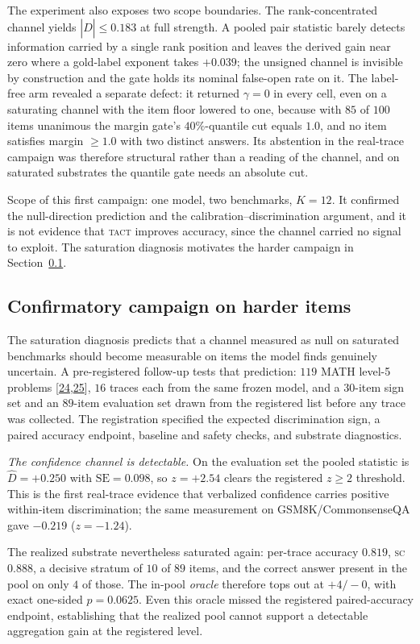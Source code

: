 \documentclass[conference]{IEEEtran}
\newcommand{\Dhat}{\widehat{D}}
\newcommand{\SC}{\textsc{sc}}
\newcommand{\TACT}{\textsc{tact}}
\begin{document}
The experiment also exposes two scope boundaries. The
rank-concentrated channel yields $|\Dhat|\le0.183$ at full strength. A pooled
pair statistic barely detects information carried by a single rank position and
leaves the derived gain near zero where a gold-label exponent takes $+0.039$;
the unsigned channel is invisible by construction and the gate holds its
nominal false-open rate on it. The label-free arm revealed a separate defect: it
returned $\gamma=0$ in every cell, even on a saturating channel with the item floor
lowered to one, because with $85$ of $100$ items unanimous the margin gate's
$40\%$-quantile cut equals $1.0$, and no item satisfies margin $\ge 1.0$ with
two distinct answers. Its abstention in the real-trace campaign was therefore structural rather
than a reading of the channel, and on saturated substrates the quantile gate
needs an absolute cut.

Scope of this first campaign: one model, two benchmarks, $K{=}12$. It confirmed
the null-direction prediction and the calibration--discrimination argument, and
it is not evidence that \TACT{} improves accuracy, since the channel carried no
signal to exploit. The saturation diagnosis motivates the harder campaign in
Section~\ref{sec:hard}.

\subsection{Confirmatory campaign on harder items}\label{sec:hard}
The saturation diagnosis predicts that a channel measured as null on saturated benchmarks
should become measurable on items the model finds genuinely uncertain. A
pre-registered follow-up tests that prediction: $119$ MATH level-5 problems
[\hyperlink{bib:math500}{24},\hyperlink{bib:lightman2024verify}{25}], $16$ traces each from the same frozen
model, and a $30$-item sign set and an $89$-item evaluation set drawn from the
registered list before any trace was collected. The registration specified the
expected discrimination sign, a paired accuracy endpoint, baseline and safety
checks, and substrate diagnostics.

\emph{The confidence channel is detectable.} On the evaluation set the pooled statistic is
$\Dhat=+0.250$ with $\mathrm{SE}=0.098$, so $z=+2.54$ clears the registered
$z\ge2$ threshold. This is
the first real-trace evidence that verbalized confidence carries positive
within-item discrimination; the same measurement on GSM8K/CommonsenseQA gave
$-0.219$ ($z=-1.24$).

The realized substrate nevertheless saturated again: per-trace accuracy
$0.819$, \SC{} $0.888$, a decisive
stratum of $10$ of $89$ items, and the correct answer present in the pool on
only $4$ of those. The in-pool \emph{oracle} therefore tops out at $+4/-0$,
with exact one-sided $p=0.0625$. Even this oracle missed the registered
paired-accuracy endpoint, establishing that the realized pool cannot support a
detectable aggregation gain at the registered level.
\end{document}
